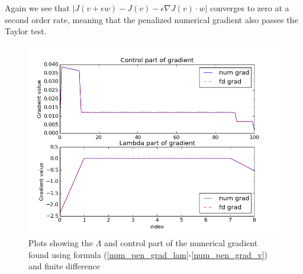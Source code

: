 \\
\\
Again we see that $|J(v+\epsilon w)-J(v)-\epsilon \nabla J(v)\cdot w|$ converges to zero at a second order rate, meaning that the penalized numerical gradient also passes the Taylor test.
\begin{figure}[h]
\caption{Plots showing the $\Lambda$ and control part of the numerical gradient found using formula (\ref{num_pen_grad_lam}-\ref{num_pen_grad_v}) and finite difference}
\centering
\includegraphics[scale=0.5]{pen_num_grad.png}
\end{figure}
